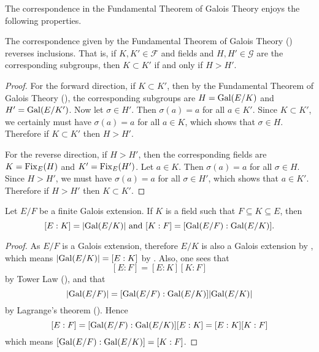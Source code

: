The correspondence in the Fundamental Theorem of Galois Theory enjoys the following properties.

\begin{corollary}\label{corollary-fundamental-theorem-of-galois-theory-is-inclusion-reversing}
    The correspondence given by the Fundamental Theorem of Galois Theory () reverses inclusions. That is, if $K, K' \in \mathcal{F}$ and fields and $H, H' \in \mathcal{G}$ are the corresponding subgroups, then $K \subset K'$ if and only if $H > H'$.
\end{corollary}
\begin{proof}
    For the forward direction, if $K \subset K'$, then by the Fundamental Theorem of Galois Theory (), the corresponding subgroups are $H = \mathrm{Gal}(E/K)$ and $H' = \mathrm{Gal}(E/K')$. Now let $\sigma \in H'$. Then $\sigma(a) = a$ for all $a \in K'$. Since $K \subset K'$, we certainly must have $\sigma(a) = a$ for all $a \in K$, which shows that $\sigma \in H$. Therefore if $K \subset K'$ then $H > H'$.

    For the reverse direction, if $H > H'$, then the corresponding fields are $K = \mathrm{Fix}_{E}(H)$ and $K' = \mathrm{Fix}_{E}(H')$. Let $a \in K$. Then $\sigma(a) = a$ for all $\sigma \in H$. Since $H > H'$, we must have $\sigma(a) = a$ for all $\sigma \in H'$, which shows that $a \in K'$. Therefore if $H > H'$ then $K \subset K'$.
\end{proof}

\begin{corollary}\label{corollary-intermediate-field-galois-field-order}
    Let $E/F$ be a finite Galois extension. If $K$ is a field such that $F \subseteq K \subseteq E$, then
    \[
        [E:K] = |\mathrm{Gal}(E/K)| \text{ and } [K:F] = [\mathrm{Gal}(E/F):\mathrm{Gal}(E/K)].
    \]
\end{corollary}
\begin{proof}
    As $E/F$ is a Galois extension, therefore $E/K$ is also a Galois extension by , which means $|\mathrm{Gal}(E/K)| = [E:K]$ by . Also, one sees that
    \[
        [E:F] = [E:K][K:F]
    \]
    by Tower Law (), and that
    \[
        |\mathrm{Gal}(E/F)| = [\mathrm{Gal}(E/F):\mathrm{Gal}(E/K)]|\mathrm{Gal}(E/K)|
    \]
    by Lagrange's theorem (). Hence
    \[
        [E:F] = [\mathrm{Gal}(E/F):\mathrm{Gal}(E/K)][E:K] = [E:K][K:F]
    \]
    which means $[\mathrm{Gal}(E/F):\mathrm{Gal}(E/K)] = [K:F]$.
\end{proof}

